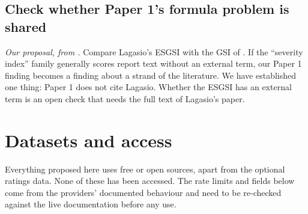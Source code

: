 \documentclass[12pt,a4paper]{article}
\begin{document}
\subsection{Check whether Paper 1's formula problem is shared}
\emph{Our proposal, from \citet{lagasio2024}.} Compare Lagasio's ESGSI with the GSI of
\citet{davidescu2026}. If the ``severity index'' family generally scores report text without an
external term, our Paper 1 finding becomes a finding about a strand of the literature. We have
established one thing: Paper 1 does not cite Lagasio. Whether the ESGSI has an external term is an
open check that needs the full text of Lagasio's paper.
\section{Datasets and access}
\label{sec:data}

Everything proposed here uses free or open sources, apart from the optional ratings data. None of
these has been accessed. The rate limits and fields below come from the providers' documented
behaviour and need to be re-checked against the live documentation before any use.
\end{document}
